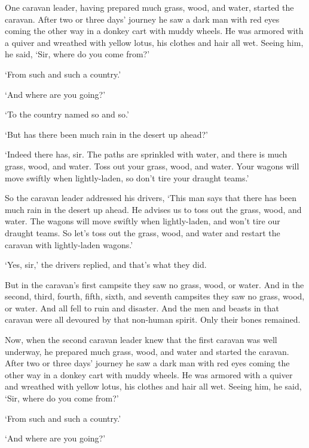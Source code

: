 \documentclass[12pt,openany]{book}%
\begin{document}
One caravan leader, having prepared much grass, wood, and water, started the caravan. After two or three days’ journey he saw a dark man with red eyes coming the other way in a donkey cart with muddy wheels. He was armored with a quiver and wreathed with yellow lotus, his clothes and hair all wet. Seeing him, he said, ‘Sir, where do you come from?’ 

‘From such and such a country.’ 

‘And where are you going?’ 

‘To the country named so and so.’ 

‘But has there been much rain in the desert up ahead?’ 

‘Indeed there has, sir. The paths are sprinkled with water, and there is much grass, wood, and water. Toss out your grass, wood, and water. Your wagons will move swiftly when lightly-laden, so don’t tire your draught teams.’ 

So the caravan leader addressed his drivers, ‘This man says that there has been much rain in the desert up ahead. He advises us to toss out the grass, wood, and water. The wagons will move swiftly when lightly-laden, and won’t tire our draught teams. So let’s toss out the grass, wood, and water and restart the caravan with lightly-laden wagons.’ 

‘Yes, sir,’ the drivers replied, and that’s what they did. 

But in the caravan’s first campsite they saw no grass, wood, or water. And in the second, third, fourth, fifth, sixth, and seventh campsites they saw no grass, wood, or water. And all fell to ruin and disaster. And the men and beasts in that caravan were all devoured by that non-human spirit. Only their bones remained. 

Now, when the second caravan leader knew that the first caravan was well underway, he prepared much grass, wood, and water and started the caravan. After two or three days’ journey he saw a dark man with red eyes coming the other way in a donkey cart with muddy wheels. He was armored with a quiver and wreathed with yellow lotus, his clothes and hair all wet. Seeing him, he said, ‘Sir, where do you come from?’ 

‘From such and such a country.’ 

‘And where are you going?’ 
\end{document}
